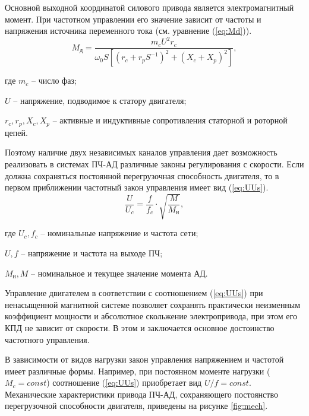         Основной выходной координатой силового привода является
        электромагнитный момент. При частотном управлении его значение зависит
        от частоты и напряжения источника переменного тока (см. уравнение
        (\ref{eq:Md})).
        \begin{equation}
            \label{eq:Md}
            M_\text{д} = \frac{m_c U^2 r_c}{\omega_0 S \left[ (r_c+r_p S^{-1})^2+
                (X_c+X_p)^2\right]},
        \end{equation}

        где $m_c$ -- число фаз;

        $U$ -- напряжение, подводимое к статору двигателя;

        $r_c, r_p, X_c, X_p$ -- активные и индуктивные сопротивления статорной
        и роторной цепей.

        Поэтому наличие двух независимых каналов управления дает возможность
        реализовать в системах ПЧ-АД различные законы регулирования с скорости.
        Если должна сохраняться постоянной перегрузочная способность двигателя,
        то в первом приближении частотный закон управления имеет вид (\ref{eq:UUs}).
        \begin{equation}
            \label{eq:UUs}
            \frac{U}{U_c} = \frac{f}{f_c} \cdot \sqrt{\frac{M}{M_\text{н}}},
        \end{equation}

        где $U_c, f_c$ -- номинальные напряжение и частота сети;

        $U, f$ -- напряжение и частота на выходе ПЧ;

        $M_\text{н}, M$ -- номинальное и текущее значение момента АД.

        Управление двигателем в соответствии с соотношением (\ref{eq:UUs}) при
        ненасыщенной магнитной системе позволяет сохранять практически
        неизменным коэффициент мощности и абсолютное скольжение электропривода,
        при этом его КПД не зависит от скорости. В этом и заключается основное
        достоинство частотного управления.

        В зависимости от видов нагрузки закон управления напряжением и частотой
        имеет различные формы. Например, при постоянном моменте нагрузки
        ($M_c=const$) соотношение (\ref{eq:UUs}) приобретает вид $U/f=const$.
        Механические характеристики привода ПЧ-АД, сохраняющего постоянство
        перегрузочной способности двигателя, приведены
        на рисунке \ref{fig:mech}.

